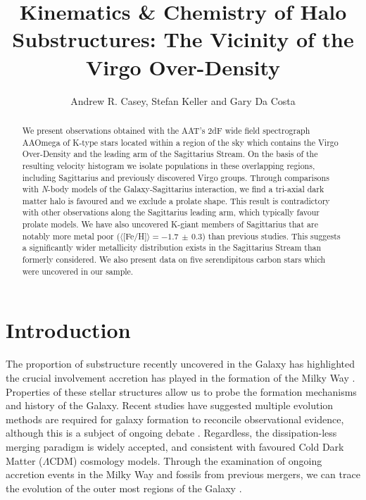 \documentclass[preprint2]{aastex}
\begin{document}
\title{Kinematics \& Chemistry of Halo Substructures: The Vicinity of the Virgo Over-Density}

\author{Andrew R. Casey, Stefan Keller and Gary Da Costa}
		
	
\begin{abstract}
We present observations obtained with the AAT's 2dF wide field spectrograph AAOmega of K-type stars located within a region of the sky which contains the Virgo Over-Density and the leading arm of the Sagittarius Stream.  On the basis of the resulting velocity histogram we isolate populations in these overlapping regions, including Sagittarius and previously discovered Virgo groups. Through comparisons with \textit{N}-body models of the Galaxy-Sagittarius interaction, we find a tri-axial dark matter halo is favoured and we exclude a prolate shape. This result is contradictory with other observations along the Sagittarius leading arm, which typically favour prolate models.  We have also uncovered K-giant members of Sagittarius that are notably more metal poor ($\langle[$Fe/H$]\rangle = -1.7\,\pm\,0.3$) than previous studies. This suggests a significantly wider metallicity distribution exists in the Sagittarius Stream than formerly considered. We also present data on five serendipitous carbon stars which were uncovered in our sample.
\end{abstract}



\section{Introduction}
\label{sec:introduction}

The proportion of substructure recently uncovered in the Galaxy has highlighted the crucial involvement accretion has played in the formation of the Milky Way \citep{Bell;et-al_2008}. Properties of these stellar structures allow us to probe the formation mechanisms and history of the Galaxy. Recent studies \citep{Carollo;et-al_2007, Carollo;et-al_2010} have suggested multiple evolution methods are required for galaxy formation to reconcile observational evidence, although this is a subject of ongoing debate \citep{Schoenrich;et-al_2010}. Regardless, the dissipation-less merging paradigm is widely accepted, and consistent with favoured Cold Dark Matter ($\Lambda$CDM) cosmology models. Through the examination of ongoing accretion events in the Milky Way and fossils from previous mergers, we can trace the evolution of the outer most regions of the Galaxy \citep[e.g.,][]{Helmi;White_2001}.
	
\end{document}
